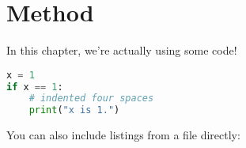 \chapter{Method}\label{ch:method}

In this chapter, we're actually using some code!

\begin{lstlisting}[language=Python,caption={This is an example of inline listing},captionpos=b]
x = 1
if x == 1:
    # indented four spaces
    print("x is 1.")

\end{lstlisting}

You can also include listings from a file directly\cite{Goodliffe2007}:


